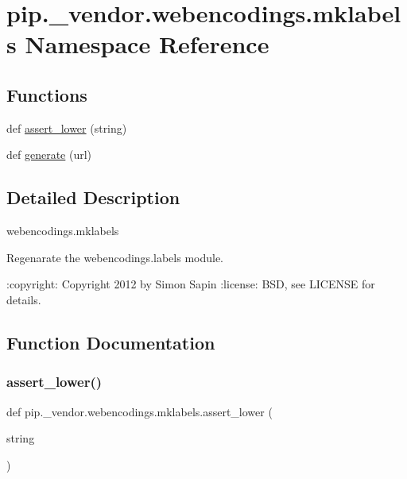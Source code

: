 \hypertarget{namespacepip_1_1__vendor_1_1webencodings_1_1mklabels}{}\section{pip.\+\_\+vendor.\+webencodings.\+mklabels Namespace Reference}
\label{namespacepip_1_1__vendor_1_1webencodings_1_1mklabels}
\subsection*{Functions}
\begin{DoxyCompactItemize}
\item 
def \hyperlink{namespacepip_1_1__vendor_1_1webencodings_1_1mklabels_ad182b5835a05c1cf8b7b302964461123}{assert\+\_\+lower} (string)
\item 
def \hyperlink{namespacepip_1_1__vendor_1_1webencodings_1_1mklabels_abb4a20a414119cdb2d478f6b18816eac}{generate} (url)
\end{DoxyCompactItemize}


\subsection{Detailed Description}
\begin{DoxyVerb}webencodings.mklabels
~~~~~~~~~~~~~~~~~~~~~

Regenarate the webencodings.labels module.

:copyright: Copyright 2012 by Simon Sapin
:license: BSD, see LICENSE for details.\end{DoxyVerb}
 

\subsection{Function Documentation}
\mbox{\label{namespacepip_1_1__vendor_1_1webencodings_1_1mklabels_ad182b5835a05c1cf8b7b302964461123}} 
\subsubsection{\texorpdfstring{assert\+\_\+lower()}{assert\_lower()}}
{\footnotesize\ttfamily def pip.\+\_\+vendor.\+webencodings.\+mklabels.\+assert\+\_\+lower (\begin{DoxyParamCaption}\item[{}]{string }\end{DoxyParamCaption})}


